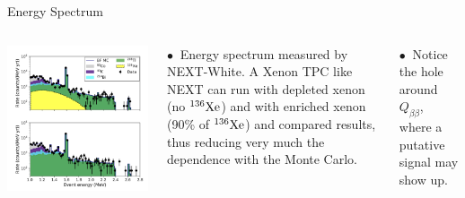 \documentclass [aspectratio=169]{beamer}
\newcommand{\bbtnu}{\ensuremath{\beta\beta2\nu}}
\newcommand{\qbb}{\ensuremath{Q_{\beta\beta}}}
\newcommand{\XE}{\ensuremath{{}^{136}{\rm Xe}}}
\begin{document}
\begin{frame}{Energy Spectrum}
\begin{columns}
\includegraphics[scale=0.26]{newSpectrum.png}

$\bullet~$ Energy spectrum measured by NEXT-White. A Xenon TPC like NEXT can run with depleted xenon (no \XE) and with enriched xenon (90\% of \XE) and compared results, thus reducing very much the dependence with the Monte Carlo. 

$\bullet~$ Notice the hole around \qbb, where a putative signal may show up. 
 \end{columns}
\end{frame}

%
%
\end{document}
